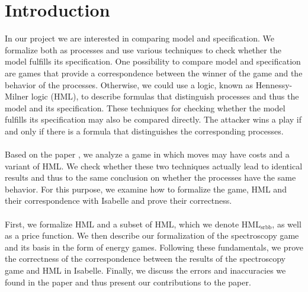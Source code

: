 \newpage
\section{Introduction}
In our project we are interested in comparing model and specification.
We formalize both as processes and use various techniques to check whether the model fulfills its specification.
One possibility to compare model and specification are games that provide a correspondence between the winner of the game and the behavior of the processes.
Otherwise, we could use a logic, known as Hennessy-Milner logic (HML), to describe formulas that distinguish processes and thus the model and its specification.
These techniques for checking whether the model fulfills its specification may also be compared directly.
The attacker wins a play if and only if there is a formula that distinguishes the corresponding processes.
\\\\
Based on the paper \cite{bisping2023lineartimebranchingtime}, we analyze a game in which moves may have costs and a variant of HML.
We check whether these two techniques actually lead to identical results and thus to the same conclusion on whether the processes have the same behavior.
For this purpose, we examine how to formalize the game, HML and their correspondence with Isabelle and prove their correctness.
\\\\
First, we formalize HML and a subset of HML, which we denote HML$_\text{srbb}$, as well as a price function.
We then describe our formalization of the spectroscopy game and its basis in the form of energy games.
Following these fundamentals, we prove the correctness of the correspondence between the results of the spectroscopy game and HML in Isabelle.
Finally, we discuss the errors and inaccuracies we found in the paper and thus present our contributions to the paper\cite{bisping2023lineartimebranchingtime}.